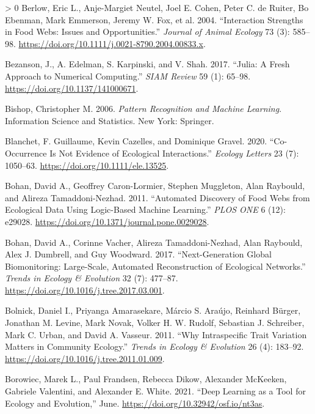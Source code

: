 \documentclass[11pt]{article}
\newlength{\cslhangindent}
\newenvironment{CSLReferences}[3] %
 {%
  \setlength{\parindent}{0pt}
  \ifodd #1 \everypar{\setlength{\hangindent}{\cslhangindent}}\ignorespaces\fi
  \ifnum #2 > 0
  \setlength{\parskip}{#2\baselineskip}
  \fi
 }%
 {}
\begin{document}
\begin{CSLReferences}{1}{0}
\leavevmode\hypertarget{ref-Berlow2004IntStr}{}%
Berlow, Eric L., Anje-Margiet Neutel, Joel E. Cohen, Peter C. de Ruiter,
Bo Ebenman, Mark Emmerson, Jeremy W. Fox, et al. 2004. {``Interaction
Strengths in Food Webs: Issues and Opportunities.''} \emph{Journal of
Animal Ecology} 73 (3): 585--98.
\url{https://doi.org/10.1111/j.0021-8790.2004.00833.x}.

\leavevmode\hypertarget{ref-Bezanson2017JulFre}{}%
Bezanson, J., A. Edelman, S. Karpinski, and V. Shah. 2017. {``Julia: A
Fresh Approach to Numerical Computing.''} \emph{SIAM Review} 59 (1):
65--98. \url{https://doi.org/10.1137/141000671}.

\leavevmode\hypertarget{ref-Bishop2006PatRec}{}%
Bishop, Christopher M. 2006. \emph{Pattern Recognition and Machine
Learning}. Information Science and Statistics. New York: Springer.

\leavevmode\hypertarget{ref-Blanchet2020CooNot}{}%
Blanchet, F. Guillaume, Kevin Cazelles, and Dominique Gravel. 2020.
{``Co-Occurrence Is Not Evidence of Ecological Interactions.''}
\emph{Ecology Letters} 23 (7): 1050--63.
\url{https://doi.org/10.1111/ele.13525}.

\leavevmode\hypertarget{ref-Bohan2011AutDis}{}%
Bohan, David A., Geoffrey Caron-Lormier, Stephen Muggleton, Alan
Raybould, and Alireza Tamaddoni-Nezhad. 2011. {``Automated Discovery of
Food Webs from Ecological Data Using Logic-Based Machine Learning.''}
\emph{PLOS ONE} 6 (12): e29028.
\url{https://doi.org/10.1371/journal.pone.0029028}.

\leavevmode\hypertarget{ref-Bohan2017NexGlo}{}%
Bohan, David A., Corinne Vacher, Alireza Tamaddoni-Nezhad, Alan
Raybould, Alex J. Dumbrell, and Guy Woodward. 2017. {``Next-Generation
Global Biomonitoring: Large-Scale, Automated Reconstruction of
Ecological Networks.''} \emph{Trends in Ecology \& Evolution} 32 (7):
477--87. \url{https://doi.org/10.1016/j.tree.2017.03.001}.

\leavevmode\hypertarget{ref-Bolnick2011WhyInt}{}%
Bolnick, Daniel I., Priyanga Amarasekare, Márcio S. Araújo, Reinhard
Bürger, Jonathan M. Levine, Mark Novak, Volker H. W. Rudolf, Sebastian
J. Schreiber, Mark C. Urban, and David A. Vasseur. 2011. {``Why
Intraspecific Trait Variation Matters in Community Ecology.''}
\emph{Trends in Ecology \& Evolution} 26 (4): 183--92.
\url{https://doi.org/10.1016/j.tree.2011.01.009}.

\leavevmode\hypertarget{ref-Borowiec2021DeeLea}{}%
Borowiec, Marek L., Paul Frandsen, Rebecca Dikow, Alexander McKeeken,
Gabriele Valentini, and Alexander E. White. 2021. {``Deep Learning as a
Tool for Ecology and Evolution,''} June.
\url{https://doi.org/10.32942/osf.io/nt3as}.


\end{CSLReferences}
\end{document}
